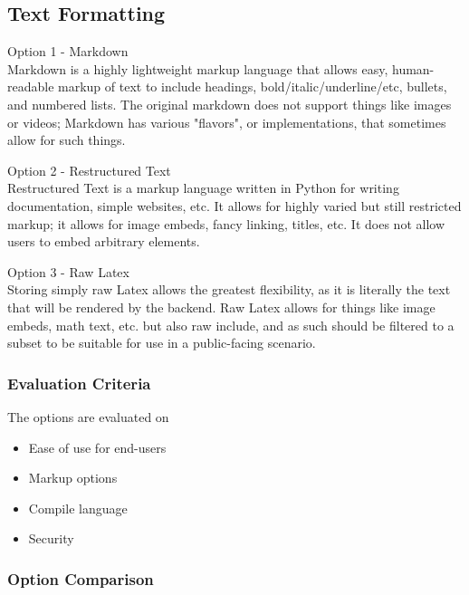 \documentclass[onecolumn, draftclsnofoot,10pt, compsoc]{IEEEtran}
\begin{document}
{\newpage
\subsection{Text Formatting}

\noindent Option 1 - Markdown \\
\noindent Markdown is a highly lightweight markup language that allows easy, human-readable markup
of text to include headings, bold/italic/underline/etc, bullets, and numbered lists.
 The original markdown does not support things like images or videos; Markdown has various
 "flavors", or implementations, that sometimes allow for such things.

\medskip

\noindent Option 2 - Restructured Text \\
\noindent Restructured Text is a markup language written in Python for writing documentation,
simple websites, etc. It allows for highly varied but still restricted markup; it allows
for image embeds, fancy linking, titles, etc. It does not allow users to embed arbitrary elements.

\medskip

\noindent Option 3 - Raw Latex \\
\noindent Storing simply raw Latex allows the greatest flexibility, as it is literally the
text that will be rendered by the backend. Raw Latex allows for things like image embeds,
math text, etc. but also raw include, and as such should be filtered to a
subset to be suitable for use in a public-facing scenario.

\medskip
\subsubsection{Evaluation Criteria}
{\noindent The options are evaluated on

\begin{itemize}
\item Ease of use for end-users
\item Markup options
\item Compile language
\item Security
\end{itemize}

 \par}


\newpage
\subsubsection{Option Comparison} ~\\

}
\end{document}
